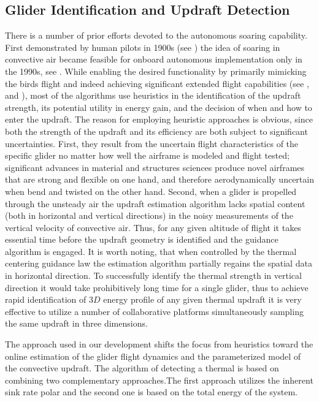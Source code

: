 \documentclass{ifacconf}
\begin{document}
\subsection{Glider Identification and Updraft Detection}
\label{subsec:SysID}

There is a number of prior efforts devoted to the autonomous soaring capability. First demonstrated by human pilots in 1900s (see \cite{Simons:1998}) the idea of soaring in convective air became feasible for onboard autonomous implementation only in the 1990s, see \cite{Wharington:1998}. While enabling the desired functionality by primarily mimicking the birds flight and indeed achieving significant extended flight capabilities (see \cite{Edwards:2008}, \cite{Allen:2006} and \cite{Allen:2007}), most of the algorithms use heuristics in the identification of the updraft strength, its potential utility in energy gain, and the decision of when and how to enter the updraft. The reason for employing heuristic approaches is obvious, since both the strength of the updraft and its efficiency are both subject to significant uncertainties. First, they result from the uncertain flight characteristics of the specific glider no matter how well the airframe is modeled and flight tested; significant advances in material and structures sciences produce novel airframes that are strong and flexible on one hand, and therefore aerodynamically uncertain when bend and twisted on the other hand. Second, when a glider is propelled through the unsteady air the updraft estimation algorithm lacks spatial content (both in horizontal and vertical directions) in the noisy measurements of the vertical velocity of convective air. Thus, for any given altitude of flight it takes essential time before the updraft geometry is identified and the guidance algorithm is engaged. It is worth noting, that when controlled by the thermal centering guidance law the estimation algorithm partially regains the spatial data in horizontal direction. To successfully identify the thermal strength in vertical direction it would take prohibitively long time for a single glider, thus to achieve rapid identification of $3D$ energy profile of any given thermal updraft it is very effective to utilize a number of collaborative platforms simultaneously sampling the same updraft in three dimensions.

The approach used in our development shifts the focus from heuristics toward the online estimation of the glider flight dynamics and the parameterized model of the convective updraft. The algorithm of detecting a thermal is based on combining two complementary approaches.The first approach utilizes the inherent sink rate polar and the second one is based on the total energy of the system.
\end{document}
